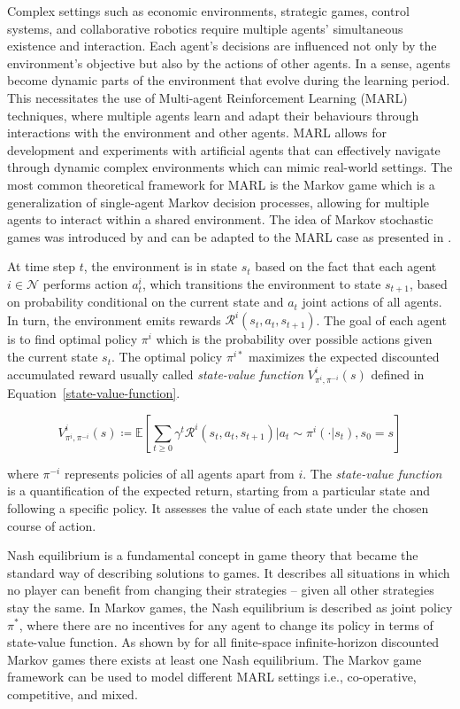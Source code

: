 \documentclass[preprint,12pt,authoryear]{elsarticle}
\begin{document}
Complex settings such as economic environments, strategic games, control systems, and collaborative robotics require multiple agents’ simultaneous existence and interaction. Each agent’s decisions are influenced not only by the environment’s objective but also by the actions of other agents. In a sense, agents become dynamic parts of the environment that evolve during the learning period. This necessitates the use of Multi-agent Reinforcement Learning (MARL) techniques, where multiple agents learn and adapt their behaviours through interactions with the environment and other agents. MARL allows for development and experiments with artificial agents that can effectively navigate through dynamic complex environments which can mimic real-world settings. The most common theoretical framework for MARL is the Markov game which is a generalization of single-agent Markov decision processes, allowing for multiple agents to interact within a shared environment. The idea of Markov stochastic games was introduced by \cite{Shapley1953} and can be adapted to the MARL case as presented in \cite{Zhang2021}. 


At time step $t$, the environment is in state $s_t$ based on the fact that each agent $i\in\mathcal{N}$ performs action  $a^i_t$, which transitions the environment to state $s_{t+1}$, based on probability conditional on the current state and $a_t$ joint actions of all agents. In turn, the environment emits rewards $\mathcal{R}^i(s_t,a_t,s_{t+1})$. The goal of each agent is to find optimal policy $\pi^i$ which is the probability over possible actions given the current state $s_t$. The optimal policy $\pi^{i*}$ maximizes the expected discounted accumulated reward usually called \textit{state-value function} $V^i_{\pi^i,\pi^{-i}}(s)$ defined in Equation~\ref{state-value-function}.

\begin{equation}\label{state-value-function}
    V^i_{\pi^i,\pi^{-i}}(s)\coloneqq\mathbb{E}\left[\sum\limits_{t\geq0}\gamma^t\mathcal{R}^i(s_t,a_t,s_{t+1})\bigg| a_t\sim \pi^i(\cdot|s_t),s_0=s\right]
\end{equation}

where $\pi^{-i}$ represents policies of all agents apart from $i$. The \textit{state-value function} is a quantification of the expected return, starting from a particular state and following a specific policy. It assesses the value of each state under the chosen course of action. 

Nash equilibrium is a fundamental concept in game theory that became the standard way of describing solutions to games. It describes all situations in which no player can benefit from changing their strategies – given all other strategies stay the same. In Markov games, the Nash equilibrium is described as joint policy $\pi^*$, where there are no incentives for any agent to change its policy in terms of state-value function. As shown by \cite{Filar1996} for all finite-space infinite-horizon discounted Markov games there exists at least one Nash equilibrium. The Markov game framework can be used to model different MARL settings i.e., co-operative, competitive, and mixed.
\end{document}
